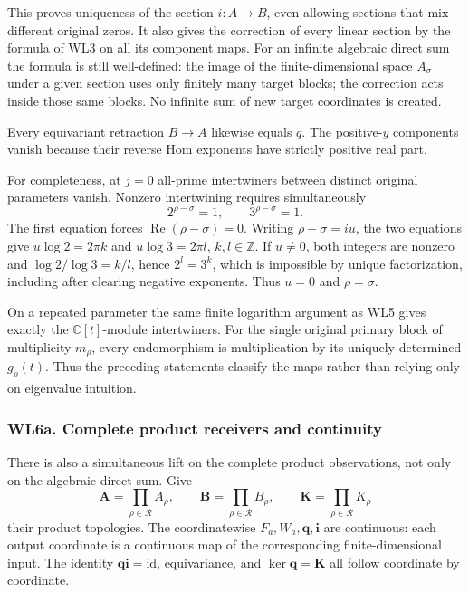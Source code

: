 This proves uniqueness of the section \(i:A\to B\), even allowing
sections that mix different original zeros. It also gives the correction
of every linear section by the formula of WL3 on all its component maps.
For an infinite algebraic direct sum the formula is still well-defined:
the image of the finite-dimensional space \(A_\sigma\) under a given
section uses only finitely many target blocks; the correction acts
inside those same blocks. No infinite sum of new target coordinates is
created.

Every equivariant retraction \(B\to A\) likewise equals \(q\). The
positive-\(y\) components vanish because their reverse Hom exponents
have strictly positive real part.

For completeness, at \(j=0\) all-prime intertwiners between distinct
original parameters vanish. Nonzero intertwining requires simultaneously
\[
 2^{\rho-\sigma}=1,\qquad3^{\rho-\sigma}=1.
\tag{WL6.5}
\] The first equation forces \(\operatorname{Re}(\rho-\sigma)=0\).
Writing \(\rho-\sigma=i u\), the two equations give \(u\log2=2\pi k\)
and \(u\log3=2\pi l\), \(k,l\in\mathbb Z\). If \(u\ne0\), both integers
are nonzero and \(\log2/\log3=k/l\), hence \(2^l=3^k\), which is
impossible by unique factorization, including after clearing negative
exponents. Thus \(u=0\) and \(\rho=\sigma\).

On a repeated parameter the same finite logarithm argument as WL5 gives
exactly the \(\mathbb C[t]\)-module intertwiners. For the single
original primary block of multiplicity \(m_\rho\), every endomorphism is
multiplication by its uniquely determined \(g_\rho(t)\). Thus the
preceding statements classify the maps rather than relying only on
eigenvalue intuition.

\subsubsection{WL6a. Complete product receivers and
continuity}\label{wl6a.-complete-product-receivers-and-continuity}

There is also a simultaneous lift on the complete product observations,
not only on the algebraic direct sum. Give \[
 \mathbf A=\prod_{\rho\in\mathcal R}A_\rho,\qquad
 \mathbf B=\prod_{\rho\in\mathcal R}B_\rho,\qquad
 \mathbf K=\prod_{\rho\in\mathcal R}K_\rho
\] their product topologies. The coordinatewise
\(F_a,W_a,\mathbf q,\mathbf i\) are continuous: each output coordinate
is a continuous map of the corresponding finite-dimensional input. The
identity \(\mathbf q\mathbf i=\mathrm{id}\), equivariance, and
\(\ker\mathbf q=\mathbf K\) all follow coordinate by coordinate.

